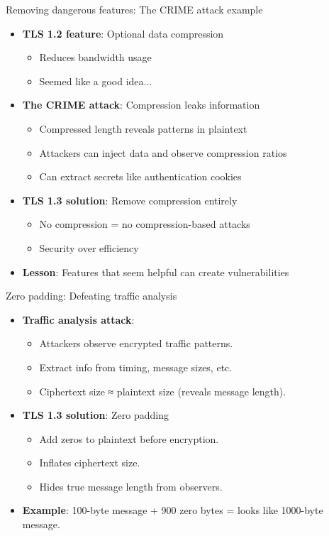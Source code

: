 \documentclass[aspectratio=169, lualatex, handout]{beamer}
\begin{document}
\begin{frame}{Removing dangerous features: The CRIME attack example}
	\begin{itemize}[<+->]
		\item \textbf{TLS 1.2 feature}: Optional data compression
		      \begin{itemize}
			      \item Reduces bandwidth usage
			      \item Seemed like a good idea...
		      \end{itemize}
		\item \textbf{The CRIME attack}: Compression leaks information
		      \begin{itemize}
			      \item Compressed length reveals patterns in plaintext
			      \item Attackers can inject data and observe compression ratios
			      \item Can extract secrets like authentication cookies
		      \end{itemize}
		\item \textbf{TLS 1.3 solution}: Remove compression entirely
		      \begin{itemize}
			      \item No compression = no compression-based attacks
			      \item Security over efficiency
		      \end{itemize}
		\item \textbf{Lesson}: Features that seem helpful can create vulnerabilities
	\end{itemize}
\end{frame}

\begin{frame}{Zero padding: Defeating traffic analysis}
	\begin{itemize}[<+->]
		\item \textbf{Traffic analysis attack}:
		      \begin{itemize}
			      \item Attackers observe encrypted traffic patterns.
			      \item Extract info from timing, message sizes, etc.
			      \item Ciphertext size ≈ plaintext size (reveals message length).
		      \end{itemize}
		\item \textbf{TLS 1.3 solution}: Zero padding
		      \begin{itemize}
			      \item Add zeros to plaintext before encryption.
			      \item Inflates ciphertext size.
			      \item Hides true message length from observers.
		      \end{itemize}
		\item \textbf{Example}: 100-byte message + 900 zero bytes = looks like 1000-byte message.
	\end{itemize}
\end{frame}
\end{document}
